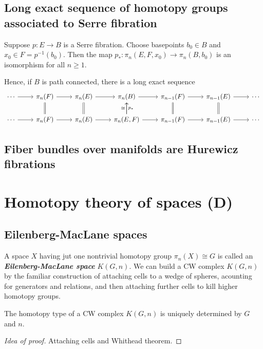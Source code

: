 \subsection{Long exact sequence of homotopy groups associated to Serre fibration}
\begin{thm}[Hatcher 4.41]
	Suppose $p:E\to B$ is a Serre fibration. Choose basepoints $b_{0}\in B$ and $x_{0}\in F=p^{-1}(b_{0})$. Then the map $p_{*}:\pi_{n}(E,F,x_{0})\to \pi_{n}(B,b_{0})$ is an isomorphism for all $n\geq 1$.

	Hence, if $B$ is path connected, there is a long exact sequence
\[\begin{tikzcd}
	\cdots\arrow[r]&\pi_n(F)\arrow[r]&\pi_n(E)\arrow[r]&\pi_n(B)\arrow[r]&\pi_{n-1}(F)\arrow[r]&\pi_{n-1}(E)\arrow[r]&\cdots\\
	\cdots\arrow[r]&\pi_n(F)\arrow[r]\arrow[u,equals]&\pi_n(E)\arrow[r]\arrow[u,equals]&\pi_n(E,F)\arrow[r]\arrow[u,"\cong "]\arrow[u,swap,"p_{*}"]&\pi_{n-1}(F)\arrow[r]\arrow[u,equals]&\pi_{n-1}(E)\arrow[r]\arrow[u,equals]&\cdots
\end{tikzcd}\]
\end{thm}

\subsection{Fiber bundles over manifolds are Hurewicz fibrations}

\section{Homotopy theory of spaces (D)}

\subsection{Eilenberg-MacLane spaces}
A space $X$ having jut one nontrivial homotopy group $\pi_{n}(X)\cong G$ is called an \textit{\textbf{Eilenberg-MacLane space}} $K(G,n)$. We can build a CW complex $K(G,n)$ by the familiar construction of attaching cells to a wedge of spheres, acounting for generators and relations, and then attaching further cells to kill higher homotopy groups.

\begin{prop}[4.30]
	The homotopy type of a CW complex $K(G,n)$ is uniquely determined by $G$ and $n$.
\end{prop}
\begin{proof}[Idea of proof]
	Attaching cells and Whithead theorem.
\end{proof}

